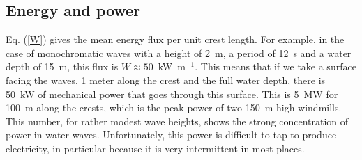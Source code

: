 \subsection{Energy and power}
Eq. (\ref{W}) gives the mean energy flux per unit crest length. 
For example, in the case of monochromatic waves with a height of 2~m, a period of 12~s and
a water depth of 15~m, this flux is 
$W\approx 50$~kW~m$^{-1}$. This means that if we take a surface facing the waves, 1 meter along the crest and the full water depth, there is 50~kW of mechanical power that goes through this surface. 
This is 5~MW for 100~m along the crests, which is the peak power of two  150~m high windmills. This number, for rather modest wave heights, 
shows the strong concentration of power in water waves. Unfortunately, this power is difficult to tap to produce electricity, in particular because it is very intermittent in most places.

